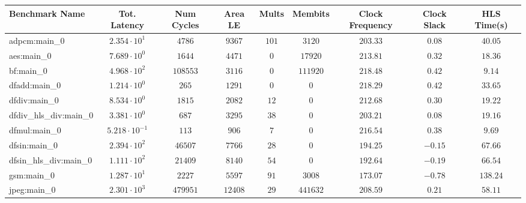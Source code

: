 \begin{tabular}{|l|c|c|c|c|c|c|c|c|}
\hline
Benchmark Name          & Tot. Latency            & Num Cycles & Area LE   & Mults   & Membits    & Clock Frequency & Clock Slack & HLS Time(s) \\
\hline
adpcm:main\_0           & $ 2.354 \cdot 10^{1}  $ & $ 4786   $ & $ 9367  $ & $ 101 $ & $ 3120   $ & $ 203.33      $ & $ 0.08    $ & $ 40.05   $ \\
aes:main\_0             & $ 7.689 \cdot 10^{0}  $ & $ 1644   $ & $ 4471  $ & $ 0   $ & $ 17920  $ & $ 213.81      $ & $ 0.32    $ & $ 18.36   $ \\
bf:main\_0              & $ 4.968 \cdot 10^{2}  $ & $ 108553 $ & $ 3116  $ & $ 0   $ & $ 111920 $ & $ 218.48      $ & $ 0.42    $ & $ 9.14    $ \\
dfadd:main\_0           & $ 1.214 \cdot 10^{0}  $ & $ 265    $ & $ 1291  $ & $ 0   $ & $ 0      $ & $ 218.29      $ & $ 0.42    $ & $ 33.65   $ \\
dfdiv:main\_0           & $ 8.534 \cdot 10^{0}  $ & $ 1815   $ & $ 2082  $ & $ 12  $ & $ 0      $ & $ 212.68      $ & $ 0.30    $ & $ 19.22   $ \\
dfdiv\_hls\_div:main\_0 & $ 3.381 \cdot 10^{0}  $ & $ 687    $ & $ 3295  $ & $ 38  $ & $ 0      $ & $ 203.21      $ & $ 0.08    $ & $ 19.16   $ \\
dfmul:main\_0           & $ 5.218 \cdot 10^{-1} $ & $ 113    $ & $ 906   $ & $ 7   $ & $ 0      $ & $ 216.54      $ & $ 0.38    $ & $ 9.69    $ \\
dfsin:main\_0           & $ 2.394 \cdot 10^{2}  $ & $ 46507  $ & $ 7766  $ & $ 28  $ & $ 0      $ & $ 194.25      $ & $ -0.15   $ & $ 67.66   $ \\
dfsin\_hls\_div:main\_0 & $ 1.111 \cdot 10^{2}  $ & $ 21409  $ & $ 8140  $ & $ 54  $ & $ 0      $ & $ 192.64      $ & $ -0.19   $ & $ 66.54   $ \\
gsm:main\_0             & $ 1.287 \cdot 10^{1}  $ & $ 2227   $ & $ 5597  $ & $ 91  $ & $ 3008   $ & $ 173.07      $ & $ -0.78   $ & $ 138.24  $ \\
jpeg:main\_0            & $ 2.301 \cdot 10^{3}  $ & $ 479951 $ & $ 12408 $ & $ 29  $ & $ 441632 $ & $ 208.59      $ & $ 0.21    $ & $ 58.11   $ \\

\end{tabular}
